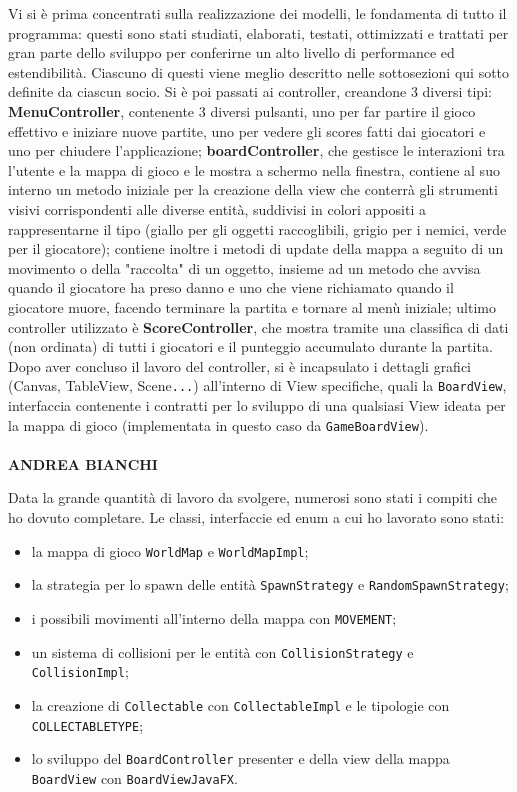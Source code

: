 \documentclass[a4paper,12pt]{report}
\begin{document}
Vi si è prima concentrati sulla realizzazione dei modelli, le fondamenta di tutto il programma: questi sono stati studiati, elaborati, testati, ottimizzati e trattati per gran parte dello sviluppo per conferirne un alto livello di performance ed estendibilità. Ciascuno di questi viene meglio descritto nelle sottosezioni qui sotto definite da ciascun socio. Si è poi passati ai controller, creandone 3 diversi tipi: \textbf{MenuController}, contenente 3 diversi pulsanti, uno per far partire il gioco effettivo e iniziare nuove partite, uno per vedere gli scores fatti dai giocatori e uno per chiudere l'applicazione; \textbf{boardController}, che gestisce le interazioni tra l'utente e la mappa di gioco e le mostra a schermo nella finestra, contiene al suo interno un metodo iniziale per la creazione della view che conterrà gli strumenti visivi corrispondenti alle diverse entità, suddivisi in colori appositi a rappresentarne il tipo (giallo per gli oggetti raccoglibili, grigio per i nemici, verde per il giocatore); contiene inoltre i metodi di update della mappa a seguito di un movimento o della "raccolta" di un oggetto, insieme ad un metodo che avvisa quando il giocatore ha preso danno e uno che viene richiamato quando il giocatore muore, facendo terminare la partita e tornare al menù iniziale; ultimo controller utilizzato è \textbf{ScoreController}, che mostra tramite una classifica di dati (non ordinata) di tutti i giocatori e il punteggio accumulato durante la partita. Dopo aver concluso il lavoro del controller, si è incapsulato i dettagli grafici (Canvas, TableView, Scene\verb|...|) all'interno di View specifiche, quali la \verb|BoardView|, interfaccia contenente i contratti per lo sviluppo di una qualsiasi View ideata per la mappa di gioco (implementata in questo caso da \verb|GameBoardView|).
\\ \\
\textbf{ANDREA BIANCHI}

Data la grande quantità di lavoro da svolgere, numerosi sono stati i compiti che ho dovuto completare. Le classi, interfaccie ed enum a cui ho lavorato sono stati:
\begin{itemize}
    \item la mappa di gioco \verb|WorldMap| e \verb|WorldMapImpl|;
    \item la strategia per lo spawn delle entità \verb|SpawnStrategy| e \verb|RandomSpawnStrategy|;
    \item i possibili movimenti all'interno della mappa con \verb|MOVEMENT|;
    \item un sistema di collisioni per le entità con \verb|CollisionStrategy| e \verb|CollisionImpl|;
    \item la creazione di \verb|Collectable| con \verb|CollectableImpl| e le tipologie con \verb|COLLECTABLETYPE|;
    \item lo sviluppo del \verb|BoardController| presenter e della view della mappa \verb|BoardView| con \verb|BoardViewJavaFX|.
\end{itemize}
\end{document}
